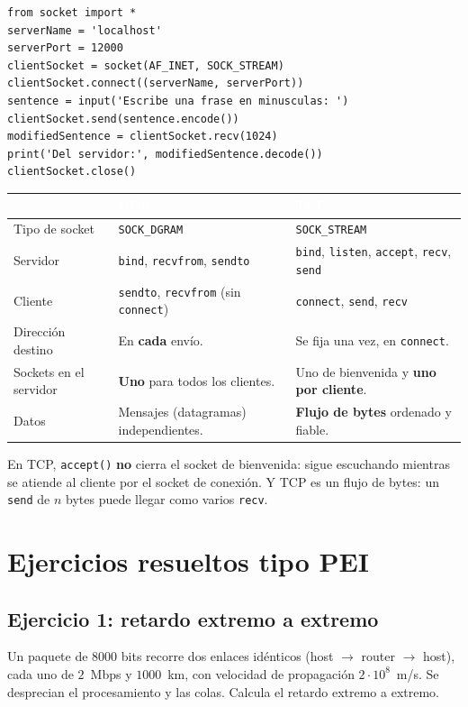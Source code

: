 \documentclass[11pt,a4paper]{article}
\newcommand{\hd}[1]{\cellcolor{uahblue}\textcolor{white}{\textbf{#1}}}
\begin{document}
\begin{lstlisting}[language=pyr,caption={TCPClient.py}]
from socket import *
serverName = 'localhost'
serverPort = 12000
clientSocket = socket(AF_INET, SOCK_STREAM)
clientSocket.connect((serverName, serverPort))
sentence = input('Escribe una frase en minusculas: ')
clientSocket.send(sentence.encode())
modifiedSentence = clientSocket.recv(1024)
print('Del servidor:', modifiedSentence.decode())
clientSocket.close()
\end{lstlisting}

\begin{tabularx}{\textwidth}{@{}L{3.6cm}XX@{}}
\toprule
 & \hd{UDP} & \hd{TCP} \\
\midrule
Tipo de socket & \texttt{SOCK\_DGRAM} & \texttt{SOCK\_STREAM} \\
Servidor & \texttt{bind}, \texttt{recvfrom}, \texttt{sendto} & \texttt{bind}, \texttt{listen}, \texttt{accept}, \texttt{recv}, \texttt{send} \\
Cliente & \texttt{sendto}, \texttt{recvfrom} (sin \texttt{connect}) & \texttt{connect}, \texttt{send}, \texttt{recv} \\
Dirección destino & En \textbf{cada} envío. & Se fija una vez, en \texttt{connect}. \\
Sockets en el servidor & \textbf{Uno} para todos los clientes. & Uno de bienvenida y \textbf{uno por cliente}. \\
Datos & Mensajes (datagramas) independientes. & \textbf{Flujo de bytes} ordenado y fiable. \\
\bottomrule
\end{tabularx}

\begin{ojo}
En TCP, \texttt{accept()} \textbf{no} cierra el socket de bienvenida: sigue escuchando mientras se atiende al cliente por el socket de conexión. Y TCP es un flujo de bytes: un \texttt{send} de $n$ bytes puede llegar como varios \texttt{recv}.
\end{ojo}

\newpage
\section{Ejercicios resueltos tipo PEI}

\subsection*{Ejercicio 1: retardo extremo a extremo}
Un paquete de $8000$ bits recorre dos enlaces idénticos (host $\to$ router $\to$ host), cada uno de $2$~Mbps y $1000$~km, con velocidad de propagación $2\cdot10^{8}$~m/s. Se desprecian el procesamiento y las colas. Calcula el retardo extremo a extremo.
\end{document}
